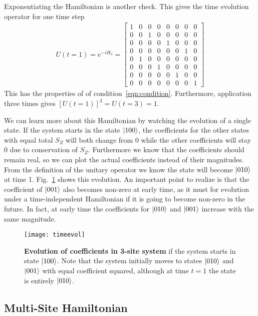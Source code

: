 Exponentiating the Hamiltonian is another check. This gives the time evolution operator for one time step
\begin{align}
U(t=1) = e^{-iH_3} = \begin{bmatrix}
1 & 0 & 0 & 0 & 0 & 0 & 0 & 0 \\
0 & 0 & 1 & 0 & 0 & 0 & 0 & 0 \\
0 & 0 & 0 & 0 & 1 & 0 & 0 & 0 \\
0 & 0 & 0 & 0 & 0 & 0 & 1 & 0 \\
0 & 1 & 0 & 0 & 0 & 0 & 0 & 0 \\
0 & 0 & 0 & 1 & 0 & 0 & 0 & 0 \\
0 & 0 & 0 & 0 & 0 & 1 & 0 & 0 \\
0 & 0 & 0 & 0 & 0 & 0 & 0 & 1
\end{bmatrix}
\end{align}
This has the properties of of condition~\ref{eqn:condition}. Furthermore, application three times gives $\left[U(t=1)\right]^3=U(t=3) = 1$. 

We can learn more about this Hamiltonian by watching the evolution of a single state. If the system starts in the state $\left|100\right\rangle$, the coefficients for the other states with equal total $S_Z$ will both change from 0 while the other coefficients will stay 0 due to conservation of $S_Z$. Furthermore we know that the coefficients should remain real, so we can plot the actual coefficients instead of their magnitudes.
From the definition of the unitary operator we know the state will become $\left|010\right\rangle$ at time 1. Fig.~\ref{fig:timeevol} shows this evolution. An important point to realize is that the coefficient of $\left|001\right\rangle$ also becomes non-zero at early time, as it must for evolution under a time-independent Hamiltonian if it is going to become non-zero in the future. In fact, at early time the coefficients for $\left|010\right\rangle$ and $\left|001\right\rangle$ increase with the same magnitude.
\begin{figure}
	\centering
	\texttt{[image: timeevol]}
	\caption{\textbf{Evolution of coefficients in 3-site system} if the system starts in state $\left|100\right\rangle$. Note that the system initially moves to states $\left|010\right\rangle$ and $\left|001\right\rangle$ with equal coefficient squared, although at time $t=1$ the state is entirely $\left|010\right\rangle$.}
	\label{fig:timeevol}
\end{figure}

\subsection{Multi-Site Hamiltonian} \label{sub:multistate}

